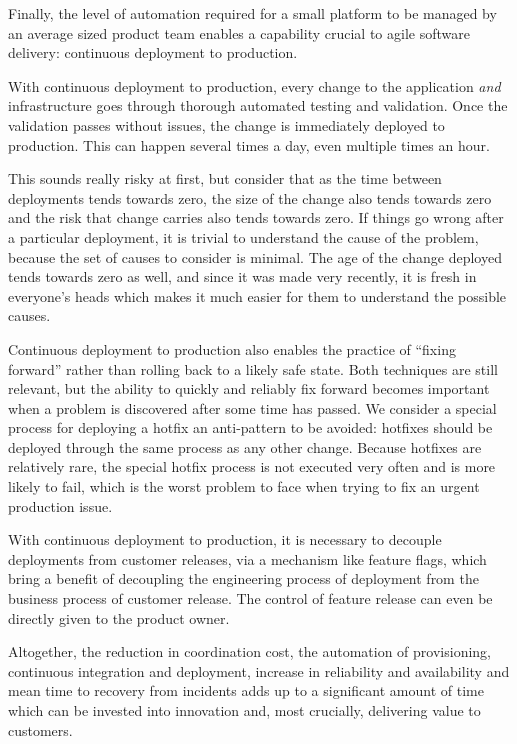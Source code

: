 \documentclass[reprint,amsmath,amssymb,aps]{revtex4-1}
\begin{document}
Finally, the level of automation required for a small platform to be managed by an average sized product team enables a capability crucial to agile software delivery: continuous deployment to production.

With continuous deployment to production, every change to the application \textit{and} infrastructure goes through thorough automated testing and validation. Once the validation passes without issues, the change is immediately deployed to production. This can happen several times a day, even multiple times an hour.

This sounds really risky at first, but consider that as the time between deployments tends towards zero, the size of the change also tends towards zero and the risk that change carries also tends towards zero. If things go wrong after a particular deployment, it is trivial to understand the cause of the problem, because the set of causes to consider is minimal. The age of the change deployed tends towards zero as well, and since it was made very recently, it is fresh in everyone’s heads which makes it much easier for them to understand the possible causes.

Continuous deployment to production also enables the practice of “fixing forward” rather than rolling back to a likely safe state. Both techniques are still relevant, but the ability to quickly and reliably fix forward becomes important when a problem is discovered after some time has passed. We consider a special process for deploying a hotfix an anti-pattern to be avoided: hotfixes should be deployed through the same process as any other change. Because hotfixes are relatively rare, the special hotfix process is not executed very often and is more likely to fail, which is the worst problem to face when trying to fix an urgent production issue.

With continuous deployment to production, it is necessary to decouple deployments from customer releases, via a mechanism like feature flags, which bring a benefit of decoupling the engineering process of deployment from the business process of customer release. The control of feature release can even be directly given to the product owner.

Altogether, the reduction in coordination cost, the automation of provisioning, continuous integration and deployment, increase in reliability and availability and mean time to recovery from incidents adds up to a significant amount of time which can be invested into innovation and, most crucially, delivering value to customers.
\end{document}
